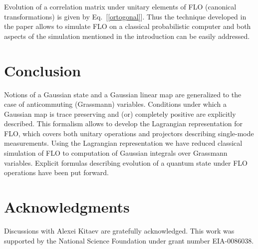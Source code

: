 \documentclass[twocolumn,showpacs,preprintnumbers,superscriptaddress]{revtex4}
\begin{document}
Evolution of a correlation
matrix under unitary elements of FLO (canonical transformations) is
given by Eq.~[\ref{ortogonal}]. Thus the technique developed in the
paper allows to simulate FLO on a classical probabilistic computer
and both aspects of the simulation mentioned in the introduction can
be easily addressed. 

\section{Conclusion}

Notions of a Gaussian state and a Gaussian linear map are
generalized to the case of anticommuting (Grassmann) variables.
Conditions under which a Gaussian map is trace preserving and (or) completely 
positive are explicitly described.
This formalism allows to develop the Lagrangian representation for FLO, which
covers both unitary operations and projectors describing single-mode
measurements. Using the Lagrangian  representation we have reduced classical simulation of
FLO to computation of Gaussian integrals over  Grassmann variables.
Explicit formulas describing evolution of a quantum state under FLO
operations have been put forward. 

\section{Acknowledgments}

Discussions with Alexei Kitaev are gratefully acknowledged.
This work was supported by the National Science Foundation under 
grant number EIA-0086038.
\end{document}
